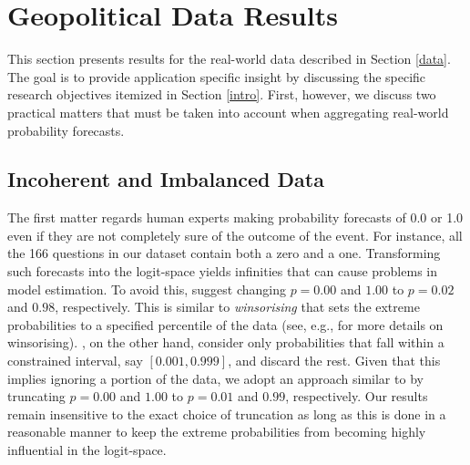 \documentclass[aoas, preprint]{imsart}
\numberwithin{equation}{section}
\theoremstyle{plain}
\begin{document}
\section{Geopolitical Data Results}
\label{realData}
\noindent
This section presents results for the real-world data described in Section \ref{data}. The goal is to provide application specific insight by discussing the specific research objectives itemized in Section \ref{intro}. First, however, we discuss two practical matters that must be taken into account when aggregating real-world  probability forecasts.

\subsection{Incoherent and Imbalanced Data}
\label{practicalMatters}
The first matter regards human experts making probability forecasts of 0.0 or 1.0 even if they are not completely sure of the outcome of the event. For instance, all the 166 questions in our dataset contain both a zero and a one. Transforming such forecasts into the logit-space yields infinities that can cause problems in model estimation. To avoid this, \citet{Ariely00theeffects} suggest changing $p = 0.00$ and $1.00$ to $p = 0.02$ and $0.98$, respectively. This is similar to \textit{winsorising} that sets the extreme probabilities to a specified percentile of the data (see, e.g., \citet{hastings1947low} for more details on winsorising).  \citet{Geo}, on the other hand, consider only probabilities that fall within a constrained interval, say $[0.001, 0.999]$, and discard the rest. Given that this implies ignoring a portion of the data, we adopt an approach similar to \citet{Ariely00theeffects}  by truncating $p = 0.00$ and $1.00$ to $p = 0.01$ and $0.99$, respectively.  Our results remain insensitive to the exact choice of truncation as long as this is done in a reasonable manner to keep the extreme probabilities from becoming highly influential in the logit-space.  
\end{document}
